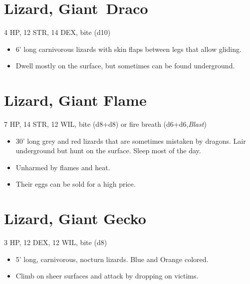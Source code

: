 \documentclass[
  10pt,
  american,
]{article}
\begin{document}
\hypertarget{lizard-giant-draco}{%
\section{Lizard, Giant~Draco}\label{lizard-giant-draco}}

4 HP, 12 STR, 14 DEX, bite (d10)

\begin{samepage}
\begin{itemize}
\setlength\itemsep{-.5em}
\item 6' long carnivorous lizards with skin flaps between legs that allow gliding.
\item Dwell mostly on the surface, but sometimes can be found underground.
\end{itemize}
\end{samepage}

\hypertarget{lizard-giant-flame}{%
\section{Lizard, Giant Flame}\label{lizard-giant-flame}}

7 HP, 14 STR, 12 WIL, bite (d8+d8) or fire breath (d6+d6,\emph{Blast})

\begin{samepage}
\begin{itemize}
\setlength\itemsep{-.5em}
\item 30' long grey and red lizards that are sometimes mistaken by dragons. Lair underground but hunt on the surface. Sleep most of the day.
\item Unharmed by flames and heat.
\item Their eggs can be sold for a high price.
\end{itemize}
\end{samepage}

\hypertarget{lizard-giant-gecko}{%
\section{Lizard, Giant Gecko}\label{lizard-giant-gecko}}

3 HP, 12 DEX, 12 WIL, bite (d8)

\begin{samepage}
\begin{itemize}
\setlength\itemsep{-.5em}
\item 5' long, carnivorous, nocturn lizards. Blue and Orange colored.
\item Climb on sheer surfaces and attack by dropping on victims.
\end{itemize}
\end{samepage}
\end{document}
